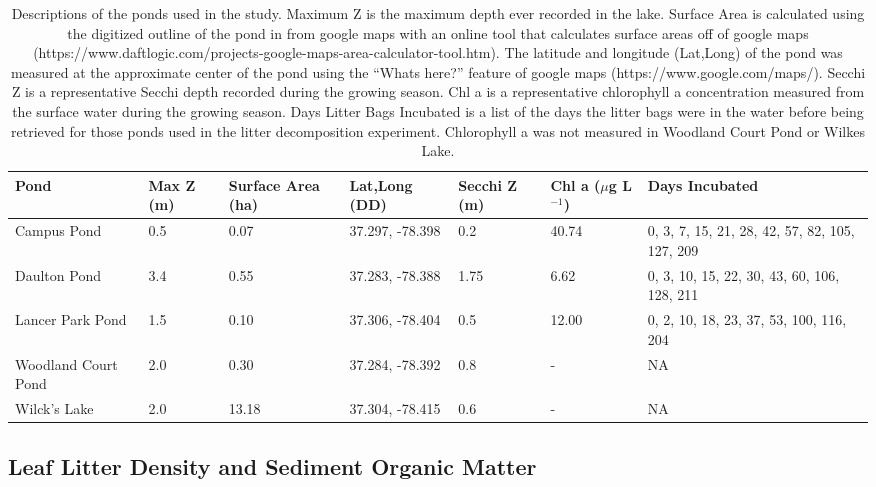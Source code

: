 \documentclass{article}
\begin{document}
\begin{center}
\begin{table}[!h] 
\tiny
\begin{tabular}{l l l l l l l}
Pond &  Max Z (m) & Surface Area (ha) & Lat,Long (DD) & Secchi Z (m) & Chl a ($\mu$g L$^{-1}$) & Days Incubated \\
\hline
Campus Pond & 0.5 & 0.07 & 37.297, -78.398 & 0.2 & 40.74 & 0, 3, 7, 15, 21, 28, 42, 57, 82, 105, 127, 209\\
Daulton Pond & 3.4 & 0.55 & 37.283, -78.388 & 1.75 & 6.62 & 0, 3, 10, 15, 22, 30, 43, 60, 106, 128, 211\\
Lancer Park Pond & 1.5 & 0.10 & 37.306, -78.404 & 0.5 & 12.00 & 0, 2, 10, 18, 23, 37, 53, 100, 116, 204\\
Woodland Court Pond & 2.0 & 0.30 & 37.284, -78.392  & 0.8 & - & NA\\
Wilck's Lake & 2.0 & 13.18 & 37.304, -78.415 & 0.6 & -  & NA\\
\hline
\end{tabular}
\caption{{\label{tab:ponds} Descriptions of the ponds used in the study. Maximum Z is the maximum depth ever recorded in the lake. Surface Area is calculated using the digitized outline of the pond in from google maps with an online tool that calculates surface areas off of google maps (https://www.daftlogic.com/projects-google-maps-area-calculator-tool.htm). The latitude and longitude (Lat,Long) of the pond was measured at the approximate center of the pond using the ``Whats here?'' feature of google maps (https://www.google.com/maps/). Secchi Z is a representative Secchi depth recorded during the growing season. Chl a is a representative chlorophyll a concentration measured from the surface water during the growing season.  Days Litter Bags Incubated is a list of the days the litter bags were in the water before being retrieved for those ponds used in the litter decomposition experiment. Chlorophyll a was not measured in Woodland Court Pond or Wilkes Lake.}}
\end{table}
\end{center}

\subsection{Leaf Litter Density and Sediment Organic Matter}
\end{document}
